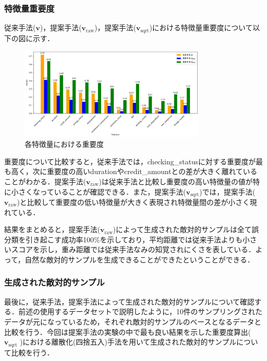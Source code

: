 \subsubsection{特徴量重要度}
従来手法($\bm{v}$)，提案手法($\bm{v}_{\mathrm{raw}}$)，提案手法($\bm{v}_{\mathrm{sqrt}}$)における特徴量重要度について以下の図に示す．
\begin{figure}[H]
    \centering
    \includegraphics[width=0.8\textwidth]{images/実験_重要度算出の結果.png}
    \caption{各特徴量における重要度}
    \label{fig:importance}
\end{figure}
重要度について比較すると，従来手法では，checking\_statusに対する重要度が最も高く，次に重要度の高いdurationやcredit\_amountとの差が大きく離れていることがわかる．提案手法($\bm{v}_{\mathrm{raw}}$)は従来手法と比較し重要度の高い特徴量の値が特に小さくなっていることが確認できる．また，提案手法($\bm{v}_{\mathrm{sqrt}}$)では，提案手法($\bm{v}_{\mathrm{raw}}$)と比較して重要度の低い特徴量が大きく表現され特徴量間の差が小さく現れている．

結果をまとめると，提案手法($\bm{v}_{\mathrm{raw}}$)によって生成された敵対的サンプルは全て誤分類を引き起こす成功率100\%を示しており，平均距離では従来手法よりも小さいスコアを示し，重み距離では従来手法なみの知覚されにくさを表している．よって，自然な敵対的サンプルを生成できることができたということができる．

\subsubsection{生成された敵対的サンプル}
最後に，従来手法，提案手法によって生成された敵対的サンプルについて確認する．前述の使用するデータセットで説明したように，10件のサンプリングされたデータが元になっているため，それぞれ敵対的サンプルのベースとなるデータと比較を行う．今回は提案手法の実験の中で最も良い結果を示した重要度算出( $\bm{v}_{\mathrm{sqrt}}$ )における離散化(四捨五入)手法を用いて生成された敵対的サンプルについて比較を行う．

